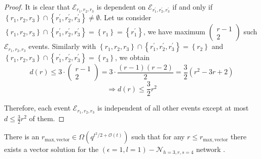 \begin{proof}
It is clear that $\mathcal{E}_{r_{1},r_{2},r_{3}}$ is dependent on
$\mathcal{E}_{r_{1}^{'},r_{2}^{'},r_{3}^{'}}$ if and only if $\left\{ r_{1},r_{2},r_{3}\right\} \cap\left\{ r_{1}^{'},r_{2}^{'},r_{3}^{'}\right\} \neq\emptyset$.
Let us consider $\left\{ r_{1},r_{2},r_{3}\right\} \cap\left\{ r_{1}^{'},r_{2}^{'},r_{3}^{'}\right\} =\left\{ r_{1}\right\} =\left\{ r_{1}^{'}\right\} $,
we have maximum $\left(\begin{array}{c}
r-1\\
2
\end{array}\right)$ such $\mathcal{E}_{r_{1},r_{2},r_{3}}$ events. Similarly with $\left\{ r_{1},r_{2},r_{3}\right\} \cap\left\{ r_{1}^{'},r_{2}^{'},r_{3}^{'}\right\} =\left\{ r_{2}\right\} $
and $\left\{ r_{1},r_{2},r_{3}\right\} \cap\left\{ r_{1}^{'},r_{2}^{'},r_{3}^{'}\right\} =\left\{ r_{3}\right\} $,
we obtain
\[
d\left(r\right)\leq3\cdot\left(\begin{array}{c}
r-1\\
2
\end{array}\right)=3\cdot\frac{\left(r-1\right)\left(r-2\right)}{2}=\frac{3}{2}\left(r^{2}-3r+2\right)
\]
\[
\Rightarrow d\left(r\right)\leq\frac{3}{2}r^{2}
\]

Therefore, each event $\mathcal{E}_{r_{1},r_{2},r_{3}}$ is independent
of all other events except at most $d\leq\frac{3}{2}r^{2}$ of them.
\end{proof}
\begin{thm}
There is an $r_{\mathrm{max,vector}}\in\Omega\left(q^{t^{2}/2+\mathcal{O}\left(t\right)}\right)$
such that for any $r\leq r_{\mathrm{max,vector}}$ there exists a
vector solution for the $\left(\epsilon=1,l=1\right)-\mathcal{N}_{h=3,r,s=4}$
network . \label{theo:r_for_vector_sol_e1l1h3rs4}
\end{thm}
